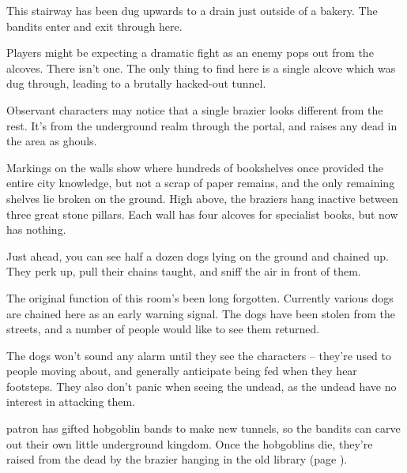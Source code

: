 \begin{multicols}{2}

\label{bakery_exit}

This stairway has been dug upwards to a drain just outside of a bakery.  The bandits enter and exit through here.

\label{oldlibrary}

Players might be expecting a dramatic fight as an enemy pops out from the alcoves.  There isn't one.  The only thing to find here is a single alcove which was dug through, leading to a brutally hacked-out tunnel.

Observant characters may notice that a single brazier looks different from the rest.  It's from the underground realm through the portal, and raises any dead in the area as ghouls.

\begin{boxtext}

	Markings on the walls show where hundreds of bookshelves once provided the entire city knowledge, but not a scrap of paper remains, and the only remaining shelves lie broken on the ground.  High above, the braziers hang inactive between three great stone pillars.  Each wall has four alcoves for specialist books, but now has nothing.

\end{boxtext}



\begin{boxtext}
	Just ahead, you can see half a dozen dogs lying on the ground and chained up.  They perk up, pull their chains taught, and sniff the air in front of them.
\end{boxtext}

The original function of this room's been long forgotten.  Currently various dogs are chained here as an early warning signal.  The dogs have been stolen from the streets, and a number of people would like to see them returned.

The dogs won't sound any alarm until they see the characters -- they're used to people moving about, and generally anticipate being fed when they hear footsteps.  They also don't panic when seeing the undead, as the undead have no interest in attacking them.


\Gls{patron} has gifted hobgoblin bands to make new tunnels, so the bandits can carve out their own little underground kingdom.  Once the hobgoblins die, they're raised from the dead by the brazier hanging in the old library (page \pageref{oldlibrary}).


\end{multicols}

